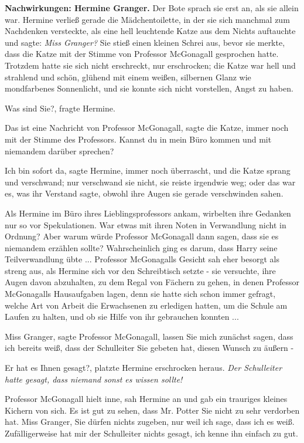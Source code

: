 \textbf{Nachwirkungen: Hermine Granger.}
Der Bote sprach sie erst an, als sie allein war. Hermine verließ gerade die
Mädchentoilette, in der sie sich manchmal zum Nachdenken versteckte, als eine
hell leuchtende Katze aus dem Nichts auftauchte und sagte: \glqq{}\emph{Miss
Granger?}\grqq{} Sie stieß einen kleinen Schrei aus, bevor sie merkte, dass die
Katze mit der Stimme von Professor McGonagall gesprochen hatte. Trotzdem hatte
sie sich nicht erschreckt, nur erschrocken; die Katze war hell und strahlend und
schön, glühend mit einem weißen, silbernen Glanz wie mondfarbenes Sonnenlicht,
und sie konnte sich nicht vorstellen, Angst zu haben.

\glqq{}Was sind Sie?\grqq{}, fragte Hermine.

\glqq{}Das ist eine Nachricht von Professor McGonagall\grqq{}, sagte die Katze,
immer noch mit der Stimme des Professors. \glqq{}Kannst du in mein Büro kommen
und mit niemandem darüber sprechen?\grqq{}

\glqq{}Ich bin sofort da\grqq{}, sagte Hermine, immer noch überrascht, und die
Katze sprang und verschwand; nur verschwand sie nicht, sie reiste irgendwie weg;
oder das war es, was ihr Verstand sagte, obwohl ihre Augen sie gerade
verschwinden sahen.

Als Hermine im Büro ihres Lieblingsprofessors ankam, wirbelten ihre Gedanken nur
so vor Spekulationen. War etwas mit ihren Noten in Verwandlung nicht in Ordnung?
Aber warum würde Professor McGonagall dann sagen, dass sie es niemandem erzählen
sollte? Wahrscheinlich ging es darum, dass Harry seine Teilverwandlung übte ...
Professor McGonagalls Gesicht sah eher besorgt als streng aus, als Hermine sich
vor den Schreibtisch setzte - sie versuchte, ihre Augen davon abzuhalten, zu dem
Regal von Fächern zu gehen, in denen Professor McGonagalls Hausaufgaben lagen,
denn sie hatte sich schon immer gefragt, welche Art von Arbeit die Erwachsenen
zu erledigen hatten, um die Schule am Laufen zu halten, und ob sie Hilfe von ihr
gebrauchen konnten ...

\glqq{}Miss Granger\grqq{}, sagte Professor McGonagall, \glqq{}lassen Sie mich
zunächst sagen, dass ich bereits weiß, dass der Schulleiter Sie gebeten hat,
diesen Wunsch zu äußern -\grqq{}

\glqq{}Er hat es Ihnen gesagt?\grqq{}, platzte Hermine erschrocken heraus.
\emph{Der Schulleiter hatte gesagt, dass niemand sonst es wissen sollte!}

Professor McGonagall hielt inne, sah Hermine an und gab ein trauriges kleines
Kichern von sich. \glqq{}Es ist gut zu sehen, dass Mr. Potter Sie nicht zu sehr
verdorben hat. Miss Granger, Sie dürfen nichts zugeben, nur weil ich sage, dass
ich es weiß. Zufälligerweise hat mir der Schulleiter nichts gesagt, ich kenne
ihn einfach zu gut.\grqq{}

